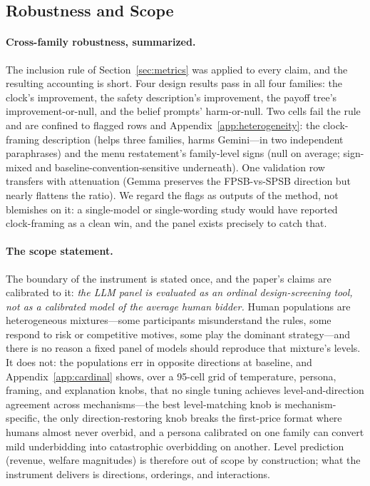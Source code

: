 \subsection{Robustness and Scope}\label{sec:discussion-scope}

\paragraph{Cross-family robustness, summarized.}
The inclusion rule of Section~\ref{sec:metrics} was applied to every claim, and the resulting accounting is short. Four design results pass in all four families: the clock's improvement, the safety description's improvement, the payoff tree's improvement-or-null, and the belief prompts' harm-or-null. Two cells fail the rule and are confined to flagged rows and Appendix~\ref{app:heterogeneity}: the clock-framing description (helps three families, harms Gemini---in two independent paraphrases) and the menu restatement's family-level signs (null on average; sign-mixed and baseline-convention-sensitive underneath). One validation row transfers with attenuation (Gemma preserves the FPSB-vs-SPSB direction but nearly flattens the ratio). We regard the flags as outputs of the method, not blemishes on it: a single-model or single-wording study would have reported clock-framing as a clean win, and the panel exists precisely to catch that.

\paragraph{The scope statement.}
The boundary of the instrument is stated once, and the paper's claims are calibrated to it: \emph{the LLM panel is evaluated as an ordinal design-screening tool, not as a calibrated model of the average human bidder.} Human populations are heterogeneous mixtures---some participants misunderstand the rules, some respond to risk or competitive motives, some play the dominant strategy---and there is no reason a fixed panel of models should reproduce that mixture's levels. It does not: the populations err in opposite directions at baseline, and Appendix~\ref{app:cardinal} shows, over a 95-cell grid of temperature, persona, framing, and explanation knobs, that no single tuning achieves level-and-direction agreement across mechanisms---the best level-matching knob is mechanism-specific, the only direction-restoring knob breaks the first-price format where humans almost never overbid, and a persona calibrated on one family can convert mild underbidding into catastrophic overbidding on another. Level prediction (revenue, welfare magnitudes) is therefore out of scope by construction; what the instrument delivers is directions, orderings, and interactions.

